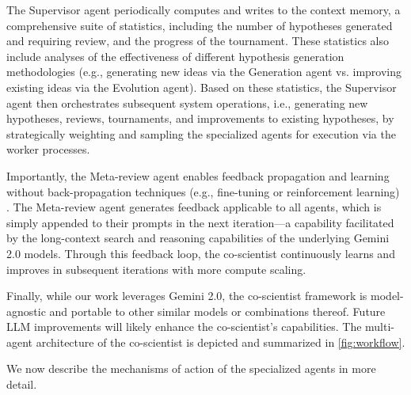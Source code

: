 The Supervisor agent periodically computes and writes to the context memory, a comprehensive suite of statistics, including the number of hypotheses generated and requiring review, and the progress of the tournament. These statistics also include analyses of the effectiveness of different hypothesis generation methodologies (e.g., generating new ideas via the Generation agent vs. improving existing ideas via the Evolution agent). Based on these statistics, the Supervisor agent then orchestrates subsequent system operations, i.e., generating new hypotheses, reviews, tournaments, and improvements to existing hypotheses, by strategically weighting and sampling the specialized agents for execution via the worker processes.

Importantly, the Meta-review agent enables feedback propagation and learning without back-propagation techniques (e.g., fine-tuning or reinforcement learning) \citep{lecun1988theoretical}. The Meta-review agent generates feedback applicable to all agents, which is simply appended to their prompts in the next iteration—a capability facilitated by the long-context search and reasoning capabilities of the underlying Gemini 2.0 models. Through this feedback loop, the co-scientist continuously learns and improves in subsequent iterations with more compute scaling.

Finally, while our work leverages Gemini 2.0, the co-scientist framework is model-agnostic and portable to other similar models or combinations thereof. Future LLM improvements will likely enhance the co-scientist's capabilities. The multi-agent architecture of the co-scientist is depicted and summarized in \cref{fig:workflow}.

We now describe the mechanisms of action of the specialized agents in more detail.

